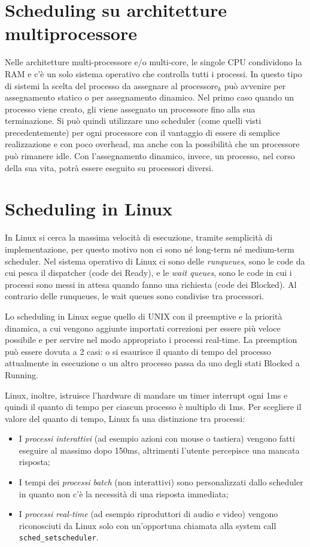\section{Scheduling su architetture multiprocessore}
Nelle architetture multi-processore e/o multi-core, le singole CPU condividono la RAM e c'è un solo sistema operativo che controlla tutti i processi. In questo tipo di sistemi la scelta del processo da assegnare al processore$_k$ può avvenire per assegnamento statico o per assegnamento dinamico. Nel primo caso quando un processo viene creato, gli viene assegnato un processore fino alla sua terminazione. Si può quindi utilizzare uno scheduler (come quelli visti precedentemente) per ogni processore con il vantaggio di essere di semplice realizzazione e con poco overhead, ma anche con la possibilità che un processore può rimanere idle. Con l'assegnamento dinamico, invece, un processo, nel corso della sua vita, potrà essere eseguito su processori diversi.

\section{Scheduling in Linux}
In Linux si cerca la massima velocità di esecuzione, tramite semplicità di implementazione, per questo motivo non ci sono né long-term né medium-term scheduler. Nel sistema operativo di Linux ci sono delle \textit{runqueues}, sono le code da cui pesca il dispatcher (code dei Ready), e le \textit{wait queues}, sono le code in cui i processi sono messi in attesa quando fanno una richiesta (code dei Blocked).
Al contrario delle runqueues, le wait queues sono condivise tra processori.

Lo scheduling in Linux segue quello di UNIX con il preemptive e la priorità dinamica, a cui vengono aggiunte importati correzioni per essere più veloce possibile e per servire nel modo appropriato i processi real-time. La preemption può essere dovuta a 2 casi: o si esaurisce il quanto di tempo del processo attualmente in esecuzione o un altro processo passa da uno degli stati Blocked a Running.

Linux, inoltre, istruisce l’hardware di mandare un timer interrupt ogni 1ms e quindi il quanto di tempo per ciascun processo è multiplo di 1ms. Per scegliere il valore del quanto di tempo, Linux fa una distinzione tra processi:
\begin{itemize}
    \item I \textit{processi interattivi} (ad esempio azioni con mouse o tastiera) vengono fatti eseguire al massimo dopo 150ms, altrimenti l’utente percepisce una mancata risposta;
    \item I tempi dei \textit{processi batch} (non interattivi) sono personalizzati dallo scheduler in quanto non c'è la necessità di una risposta immediata;
    \item I \textit{processi real-time} (ad esempio riproduttori di audio e video) vengono riconosciuti da Linux solo con un'opportuna chiamata alla system call \verb|sched_setscheduler|.
\end{itemize}

